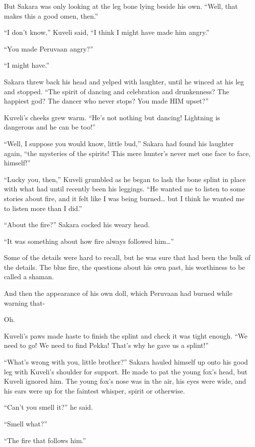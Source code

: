 But Sakara was only looking at the leg bone lying beside his own. ``Well, that makes this a good omen, then.''

``I don't know,'' Kuveli said, ``I think I might have made him angry.''

``You made Peruvaan angry?''

``I might have.''

Sakara threw back his head and yelped with laughter, until he winced at his leg and stopped. ``The spirit of dancing and celebration and drunkenness? The happiest god? The dancer who never stops? You made HIM upset?''

Kuveli's cheeks grew warm. ``He's not nothing but dancing! Lightning is dangerous and he can be too!''

``Well, I suppose you would know, little bud,'' Sakara had found his laughter again, ``the mysteries of the spirits! This mere hunter's never met one face to face, himself!''

``Lucky you, then,'' Kuveli grumbled as he began to lash the bone splint in place with what had until recently been his leggings. ``He wanted me to listen to some stories about fire, and it felt like I was being burned\ldots{} but I think he wanted me to listen more than I did.''

``About the fire?'' Sakara cocked his weary head.

``It was something about how fire always followed him\ldots''

Some of the details were hard to recall, but he was sure that had been the bulk of the details. The blue fire, the questions about his own past, his worthiness to be called a shaman.

And then the appearance of his own doll, which Peruvaan had burned while warning that-

Oh.

Kuveli's paws made haste to finish the splint and check it was tight enough. ``We need to go! We need to find Pekka! That's why he gave us a splint!''

``What's wrong with you, little brother?'' Sakara hauled himself up onto his good leg with Kuveli's shoulder for support. He made to pat the young fox's head, but Kuveli ignored him. The young fox's nose was in the air, his eyes were wide, and his ears were up for the faintest whisper, spirit or otherwise.

``Can't you smell it?'' he said.

``Smell what?''

``The fire that follows him.''

